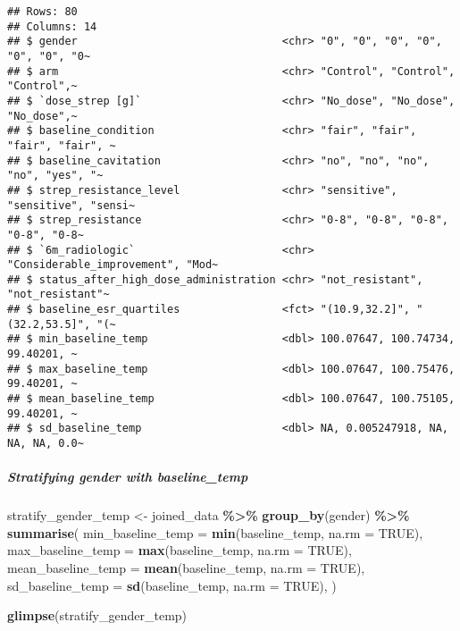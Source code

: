 \documentclass[
]{article}
\newenvironment{Shaded}{\begin{snugshade}}{\end{snugshade}}
\newcommand{\AttributeTok}[1]{\textcolor[rgb]{0.13,0.29,0.53}{#1}}
\newcommand{\ConstantTok}[1]{\textcolor[rgb]{0.56,0.35,0.01}{#1}}
\newcommand{\FunctionTok}[1]{\textcolor[rgb]{0.13,0.29,0.53}{\textbf{#1}}}
\newcommand{\NormalTok}[1]{#1}
\newcommand{\OtherTok}[1]{\textcolor[rgb]{0.56,0.35,0.01}{#1}}
\newcommand{\SpecialCharTok}[1]{\textcolor[rgb]{0.81,0.36,0.00}{\textbf{#1}}}
\begin{document}
\begin{verbatim}
## Rows: 80
## Columns: 14
## $ gender                                <chr> "0", "0", "0", "0", "0", "0", "0~
## $ arm                                   <chr> "Control", "Control", "Control",~
## $ `dose_strep [g]`                      <chr> "No_dose", "No_dose", "No_dose",~
## $ baseline_condition                    <chr> "fair", "fair", "fair", "fair", ~
## $ baseline_cavitation                   <chr> "no", "no", "no", "no", "yes", "~
## $ strep_resistance_level                <chr> "sensitive", "sensitive", "sensi~
## $ strep_resistance                      <chr> "0-8", "0-8", "0-8", "0-8", "0-8~
## $ `6m_radiologic`                       <chr> "Considerable_improvement", "Mod~
## $ status_after_high_dose_administration <chr> "not_resistant", "not_resistant"~
## $ baseline_esr_quartiles                <fct> "(10.9,32.2]", "(32.2,53.5]", "(~
## $ min_baseline_temp                     <dbl> 100.07647, 100.74734, 99.40201, ~
## $ max_baseline_temp                     <dbl> 100.07647, 100.75476, 99.40201, ~
## $ mean_baseline_temp                    <dbl> 100.07647, 100.75105, 99.40201, ~
## $ sd_baseline_temp                      <dbl> NA, 0.005247918, NA, NA, NA, 0.0~
\end{verbatim}

\subparagraph{Stratifying gender with
baseline\_temp}\label{stratifying-gender-with-baseline_temp}

\begin{Shaded}
\begin{Highlighting}[]
\NormalTok{stratify\_gender\_temp }\OtherTok{\textless{}{-}}\NormalTok{ joined\_data }\SpecialCharTok{\%\textgreater{}\%}
  \FunctionTok{group\_by}\NormalTok{(gender) }\SpecialCharTok{\%\textgreater{}\%}  
  \FunctionTok{summarise}\NormalTok{(}
    \AttributeTok{min\_baseline\_temp =} \FunctionTok{min}\NormalTok{(baseline\_temp, }\AttributeTok{na.rm =} \ConstantTok{TRUE}\NormalTok{),}
    \AttributeTok{max\_baseline\_temp =} \FunctionTok{max}\NormalTok{(baseline\_temp, }\AttributeTok{na.rm =} \ConstantTok{TRUE}\NormalTok{),}
    \AttributeTok{mean\_baseline\_temp =} \FunctionTok{mean}\NormalTok{(baseline\_temp, }\AttributeTok{na.rm =} \ConstantTok{TRUE}\NormalTok{),}
    \AttributeTok{sd\_baseline\_temp =} \FunctionTok{sd}\NormalTok{(baseline\_temp, }\AttributeTok{na.rm =} \ConstantTok{TRUE}\NormalTok{),}
\NormalTok{  ) }

\FunctionTok{glimpse}\NormalTok{(stratify\_gender\_temp)}
\end{Highlighting}
\end{Shaded}
\end{document}
